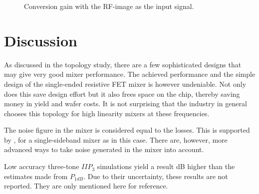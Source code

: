 			\begin{figure}[hbt!]
				\centering
				\caption[RF-image conversion gain.]{Conversion gain with the RF-image as the input signal.}\label{fig:mixerimr}
			\end{figure}

	\section{Discussion}
		As discussed in the topology study, there are a few sophisticated designs that may give very good mixer performance. The achieved performance and the simple design of the single-ended resistive FET mixer is however undeniable. Not only does this save design effort but it also frees space on the chip, thereby saving money in yield and wafer costs. It is not surprising that the industry in general chooses this topology for high linearity mixers at these frequencies.\autocite{web:hittite}

		The noise figure in the mixer is considered equal to the losses. This is supported by \citeauthor{maas05}, for a single-sideband mixer as in this case\autocite{maas05}. There are, however, more advanced ways to take noise generated in the mixer into account\autocite{kundert07}.

		Low accuracy three-tone $IIP_3$ simulations yield a result \unit[2--3]{dB} higher than the estimates made from $P_{1dB}$. Due to their uncertainty, these results are not reported. They are only mentioned here for reference.
